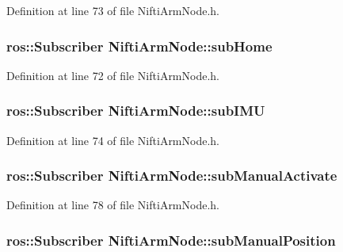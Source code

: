 \-Definition at line 73 of file \-Nifti\-Arm\-Node.\-h.

\subsubsection[{sub\-Home}]{\setlength{\rightskip}{0pt plus 5cm}ros\-::\-Subscriber {\bf \-Nifti\-Arm\-Node\-::sub\-Home}\hspace{0.3cm}{\ttfamily  [private]}}\label{classNiftiArmNode_a7919017bb05eb14e5332ddad5b62c39f}


\-Definition at line 72 of file \-Nifti\-Arm\-Node.\-h.

\subsubsection[{sub\-I\-M\-U}]{\setlength{\rightskip}{0pt plus 5cm}ros\-::\-Subscriber {\bf \-Nifti\-Arm\-Node\-::sub\-I\-M\-U}\hspace{0.3cm}{\ttfamily  [private]}}\label{classNiftiArmNode_a68eec87529249363393467cfd03c4a52}


\-Definition at line 74 of file \-Nifti\-Arm\-Node.\-h.

\subsubsection[{sub\-Manual\-Activate}]{\setlength{\rightskip}{0pt plus 5cm}ros\-::\-Subscriber {\bf \-Nifti\-Arm\-Node\-::sub\-Manual\-Activate}\hspace{0.3cm}{\ttfamily  [private]}}\label{classNiftiArmNode_adbcba844700c5a0e9e615b8673e82ca7}


\-Definition at line 78 of file \-Nifti\-Arm\-Node.\-h.

\subsubsection[{sub\-Manual\-Position}]{\setlength{\rightskip}{0pt plus 5cm}ros\-::\-Subscriber {\bf \-Nifti\-Arm\-Node\-::sub\-Manual\-Position}\hspace{0.3cm}{\ttfamily  [private]}}\label{classNiftiArmNode_a655cca7be0da353dfd18adae120f1279}


